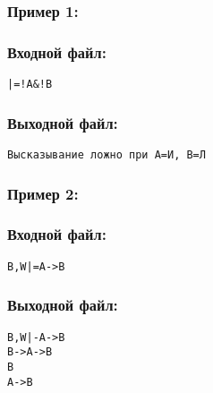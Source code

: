 \documentclass[11pt,a4paper,oneside]{article}
\begin{document}
\subsubsection*{Пример 1:}
\begin{minipage}[t]{.5\textwidth}
\subsubsection*{Входной файл:}
\begin{verbatim}
|=!A&!B
\end{verbatim}
\end{minipage}
\begin{minipage}[t]{.5\textwidth}
\subsubsection*{Выходной файл:}
\begin{verbatim}
Высказывание ложно при A=И, B=Л
\end{verbatim}
\end{minipage}

\subsubsection*{Пример 2:}
\begin{minipage}[t]{.5\textwidth}
\subsubsection*{Входной файл:}
\begin{verbatim}
B,W|=A->B
\end{verbatim}
\end{minipage}
\begin{minipage}[t]{.5\textwidth}
\subsubsection*{Выходной файл:}
\begin{verbatim}
B,W|-A->B
B->A->B
B
A->B
\end{verbatim}
\end{minipage}
\end{document}
